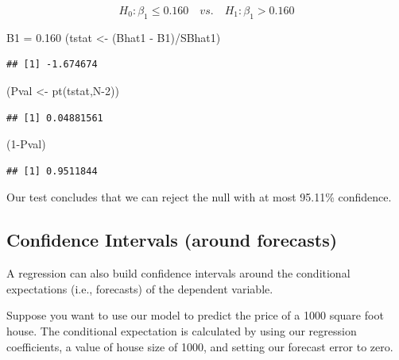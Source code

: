 \documentclass[
]{book}
\newenvironment{Shaded}{\begin{snugshade}}{\end{snugshade}}
\newcommand{\DecValTok}[1]{\textcolor[rgb]{0.00,0.00,0.81}{#1}}
\newcommand{\FloatTok}[1]{\textcolor[rgb]{0.00,0.00,0.81}{#1}}
\newcommand{\FunctionTok}[1]{\textcolor[rgb]{0.00,0.00,0.00}{#1}}
\newcommand{\NormalTok}[1]{#1}
\newcommand{\OtherTok}[1]{\textcolor[rgb]{0.56,0.35,0.01}{#1}}
\newcommand{\SpecialCharTok}[1]{\textcolor[rgb]{0.00,0.00,0.00}{#1}}
\begin{document}
\[H_0:\beta_1\leq0.160 \quad vs. \quad H_1:\beta_1>0.160\]

\begin{Shaded}
\begin{Highlighting}[]
\NormalTok{B1 }\OtherTok{=} \FloatTok{0.160}
\NormalTok{(tstat }\OtherTok{\textless{}{-}}\NormalTok{ (Bhat1 }\SpecialCharTok{{-}}\NormalTok{ B1)}\SpecialCharTok{/}\NormalTok{SBhat1)}
\end{Highlighting}
\end{Shaded}

\begin{verbatim}
## [1] -1.674674
\end{verbatim}

\begin{Shaded}
\begin{Highlighting}[]
\NormalTok{(Pval }\OtherTok{\textless{}{-}} \FunctionTok{pt}\NormalTok{(tstat,N}\DecValTok{{-}2}\NormalTok{))}
\end{Highlighting}
\end{Shaded}

\begin{verbatim}
## [1] 0.04881561
\end{verbatim}

\begin{Shaded}
\begin{Highlighting}[]
\NormalTok{(}\DecValTok{1}\SpecialCharTok{{-}}\NormalTok{Pval)}
\end{Highlighting}
\end{Shaded}

\begin{verbatim}
## [1] 0.9511844
\end{verbatim}

Our test concludes that we can reject the null with at most 95.11\% confidence.

\hypertarget{confidence-intervals-around-forecasts}{%
\subsection{Confidence Intervals (around forecasts)}\label{confidence-intervals-around-forecasts}}

A regression can also build confidence intervals around the conditional expectations (i.e., forecasts) of the dependent variable.

Suppose you want to use our model to predict the price of a 1000 square foot house. The conditional expectation is calculated by using our regression coefficients, a value of house size of 1000, and setting our forecast error to zero.
\end{document}
